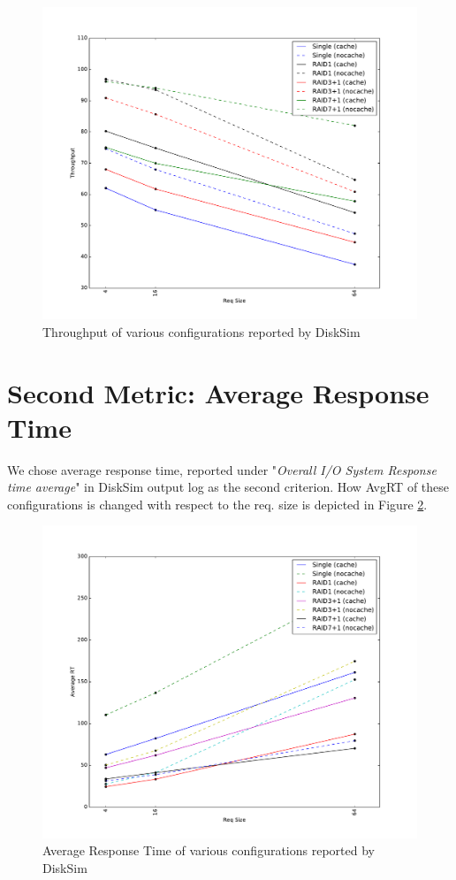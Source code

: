 \documentclass[paper=a4, fontsize=11pt]{scrartcl} %
\numberwithin{figure}{section} %
\numberwithin{table}{section} %
\begin{document}
\begin{figure}
\begin{center}
\includegraphics[width=14cm]{plot1.pdf}
\caption{Throughput of various configurations reported by DiskSim}
\label{fig1}
\end{center}
\end{figure}

\section{Second Metric: Average Response Time}
We chose average response time, reported under "\textit{Overall I/O System Response time average}" in DiskSim output log as the second criterion. How AvgRT of these configurations is changed with respect to the req. size is depicted in Figure \ref{fig2}.

\begin{figure}
\begin{center}
\includegraphics[width=14cm]{plot2.pdf}
\caption{Average Response Time of various configurations reported by DiskSim}
\label{fig2}
\end{center}
\end{figure}
\end{document}

